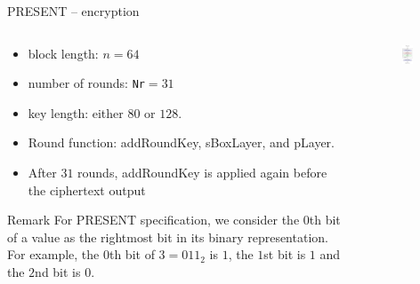 \begin{frame}{PRESENT -- encryption}
\begin{columns}[T] %
\begin{column}{.55\textwidth}
\begin{itemize}
     \item block length: $n=64$
       \item number of rounds: \texttt{Nr}$=31$
       \item key length: either $80$ or $128$.
    \item Round function: addRoundKey, sBoxLayer, and pLayer.
    \item After $31$ rounds, addRoundKey is applied again before the ciphertext output 
\end{itemize}
\begin{alertblock}{Remark}
    For PRESENT specification, we consider the $0$th bit of a value as the rightmost bit in its binary representation.
For example, the $0$th bit of $3=011_2$ is $1$, the $1$st bit is $1$ and the $2$nd bit is $0$.
\end{alertblock}
\end{column}%
\hfill%
\begin{column}{.5\textwidth}
\begin{figure}
    \includegraphics[width=0.6\textwidth]{fig/PRESENT.pdf}
\end{figure}
\end{column}%
\end{columns}
\end{frame}

